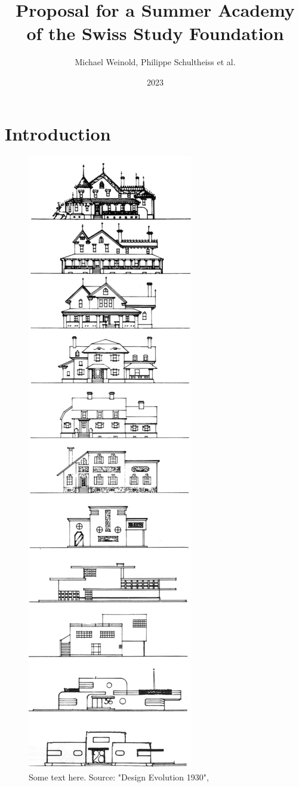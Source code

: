 \documentclass{article}
\title{Proposal for a Summer Academy of the Swiss Study Foundation}
\author{Michael Weinold, Philippe Schultheiss et al.}
\date{2023}
\begin{document}
\maketitle

\section{Introduction}

\begin{figure}[]
    \centering
    \includegraphics[height=\textheight]{./figures/loewy_architecture.png}
    \caption{
        Some text here. Source: "Design Evolution 1930", \cite{loewy_industrial_1979}
    }
    \label{fig:combined}
\end{figure}
\end{document}
